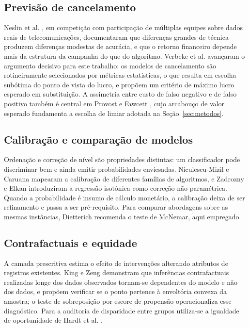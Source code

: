 \documentclass[10pt,a4paper]{article}
\begin{document}
\subsection{Previsão de cancelamento}

Neslin et al. \cite{neslin}, em competição com participação de múltiplas equipes sobre dados reais de
telecomunicações, documentaram que diferenças grandes de técnica produzem diferenças
modestas de acurácia, e que o retorno financeiro depende mais da estrutura da campanha
do que do algoritmo. Verbeke et al. \cite{verbeke} avançaram o argumento decisivo para este trabalho: os
modelos de cancelamento são rotineiramente selecionados por métricas estatísticas, o que
resulta em escolha subótima do ponto de vista do lucro, e propõem um critério de máximo
lucro esperado em substituição. A assimetria entre custo de falso negativo e de falso
positivo também é central em Provost e Fawcett \cite{provost}, cujo arcabouço de valor esperado fundamenta a
escolha de limiar adotada na Seção~\ref{sec:metodos}.

\subsection{Calibração e comparação de modelos}

Ordenação e correção de nível são propriedades distintas: um classificador pode discriminar
bem e ainda emitir probabilidades enviesadas. Niculescu-Mizil e Caruana \cite{niculescu}
mapearam a calibração de diferentes famílias de algoritmos, e Zadrozny e Elkan
\cite{zadrozny} introduziram a regressão isotônica como correção não paramétrica. Quando a
probabilidade é insumo de cálculo monetário, a calibração deixa de ser refinamento e passa a
ser pré-requisito. Para comparar abordagens sobre as mesmas instâncias, Dietterich
\cite{dietterich} recomenda o teste de McNemar, aqui empregado.

\subsection{Contrafactuais e equidade}

A camada prescritiva estima o efeito de intervenções alterando atributos de registros
existentes. King e Zeng \cite{king} demonstram que inferências contrafactuais realizadas longe
dos dados observados tornam-se dependentes do modelo e não dos dados, e propõem verificar se o
ponto pertence à envoltória convexa da amostra; o teste de sobreposição por escore de
propensão \cite{rosenbaum} operacionaliza esse diagnóstico. Para a auditoria de disparidade
entre grupos utiliza-se a igualdade de oportunidade de Hardt et al. \cite{hardt}.
\end{document}
